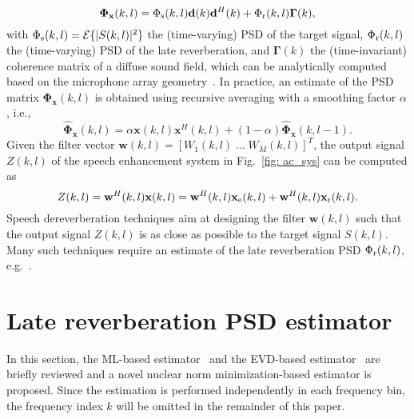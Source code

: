 \documentclass{article}
\begin{document}
\begin{equation}
  \label{eq: phi_x}
\boldsymbol{\Phi}_{\mathbf{x}}(k,l) = \Phi_{\rm s}(k,l) \mathbf{d}(k)\mathbf{d}^H(k) + \Phi_{\rm r}(k,l) \boldsymbol{\Gamma}(k),
\end{equation}
with $\Phi_{\rm s}(k,l) = {\cal{E}}\{|S(k,l)|^2\}$ the (time-varying) PSD of the target signal, $\Phi_{\rm r}(k,l)$ the (time-varying) PSD of the late reverberation, and ${\boldsymbol{\Gamma}}(k)$ the (time-invariant) coherence  matrix of a diffuse sound field, which can be analytically computed based on the microphone array geometry~\cite{Cook_JASA_1955}.
In practice, an estimate of the PSD matrix $\boldsymbol{\Phi}_{\mathbf{x}}(k,l)$ is obtained using recursive averaging with a smoothing factor $\alpha$, i.e.,
\begin{equation}
  \label{eq: rec_av}
  \hat{\boldsymbol{\Phi}}_{\mathbf{x}}(k,l) = \alpha \mathbf{x}(k,l) \mathbf{x}^H(k,l) + (1-\alpha) \hat{\boldsymbol{\Phi}}_{\mathbf{x}}(k,l-1).
\end{equation}
Given the filter vector $\mathbf{w}(k,l) = [W_1(k,l) \; \ldots \; W_M(k,l)]^T$, the output signal $Z(k,l)$ of the speech enhancement system in Fig.~\ref{fig: ac_sys} can be computed as
\begin{equation}
Z(k,l) = \mathbf{w}^H(k,l)\mathbf{x}(k,l) = \mathbf{w}^H(k,l)\mathbf{x}_{\rm e}(k,l) + \mathbf{w}^H(k,l)\mathbf{x}_{\rm r}(k,l).
\end{equation}
Speech dereverberation techniques aim at designing the filter $\mathbf{w}(k,l)$ such that the output signal $Z(k,l)$ is as close as possible to the target signal $S(k,l)$.
Many such techniques require an estimate of the late reverberation PSD $\Phi_{\rm r}(k,l)$, e.g.~\cite{Habets_PhD,OSchwartz_ITASLP_2015,Cauchi_EURASIP_2015}.


\section{Late reverberation PSD estimator}
In this section, the ML-based estimator~\cite{Kuklasinski_EUSIPCO_2014g} and the EVD-based estimator~\cite{Kodrasi_ICASSP_2017} are briefly reviewed and a novel nuclear norm minimization-based estimator is proposed. 
Since the estimation is performed independently in each frequency bin, the frequency index $k$ will be omitted in the remainder of this paper.
\end{document}
